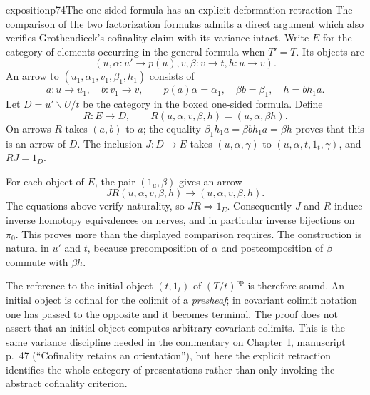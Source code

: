 \begin{dcomment}{exposition}{p74}{The one-sided formula has an explicit deformation retraction}
The comparison of the two factorization formulas admits a direct argument which also verifies Grothendieck's cofinality claim with its variance intact. Write $E$ for the category of elements occurring in the general formula when $T'=T$. Its objects are
\[
 (u,\alpha:u'\to p(u),v,\beta:v\to t,h:u\to v).
\]
An arrow to $(u_1,\alpha_1,v_1,\beta_1,h_1)$ consists of
\[
 a:u\to u_1,\quad b:v_1\to v,\qquad
 p(a)\alpha=\alpha_1,\quad \beta b=\beta_1,\quad
 h=b h_1a.
\]
Let $D=u'\backslash U/t$ be the category in the boxed one-sided formula. Define
\[
 R:E\longrightarrow D,\qquad
 R(u,\alpha,v,\beta,h)=(u,\alpha,\beta h).
\]
On arrows $R$ takes $(a,b)$ to $a$; the equality
$\beta_1h_1a=\beta b h_1a=\beta h$ proves that this is an arrow of $D$. The inclusion $J:D\to E$ takes $(u,\alpha,\gamma)$ to $(u,\alpha,t,1_t,\gamma)$, and $RJ=1_D$.

For each object of $E$, the pair $(1_u,\beta)$ gives an arrow
\[
 JR(u,\alpha,v,\beta,h)
       \longrightarrow(u,\alpha,v,\beta,h).
\]
The equations above verify naturality, so $JR\Rightarrow1_E$. Consequently $J$ and $R$ induce inverse homotopy equivalences on nerves, and in particular inverse bijections on $\pi_0$. This proves more than the displayed comparison requires. The construction is natural in $u'$ and $t$, because precomposition of $\alpha$ and postcomposition of $\beta$ commute with $\beta h$.

The reference to the initial object $(t,1_t)$ of $(T/t)^{\mathrm{op}}$ is therefore sound. An initial object is cofinal for the colimit of a \emph{presheaf}; in covariant colimit notation one has passed to the opposite and it becomes terminal. The proof does not assert that an initial object computes arbitrary covariant colimits. This is the same variance discipline needed in the commentary on Chapter~I, manuscript p.~47 (``Cofinality retains an orientation''), but here the explicit retraction identifies the whole category of presentations rather than only invoking the abstract cofinality criterion.
\end{dcomment}

